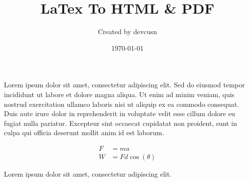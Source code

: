 \documentclass[12pt]{article}
\title{LaTex To HTML & PDF}
\author{Created by devcusn}
\date{\today}
\begin{document}
  \maketitle
  Lorem ipsum dolor sit amet, consectetur adipiscing elit. Sed do eiusmod tempor incididunt ut labore et dolore magna aliqua. Ut enim ad minim veniam, quis nostrud exercitation ullamco laboris nisi ut aliquip ex ea commodo consequat. Duis aute irure dolor in reprehenderit in voluptate velit esse cillum dolore eu fugiat nulla pariatur. Excepteur sint occaecat cupidatat non proident, sunt in culpa qui officia deserunt mollit anim id est laborum.

\begin{align}
    F &= ma \\
    W &= Fd \cos(\theta)
\end{align}


  Lorem ipsum dolor sit amet, consectetur adipiscing elit. 
\end{document}
